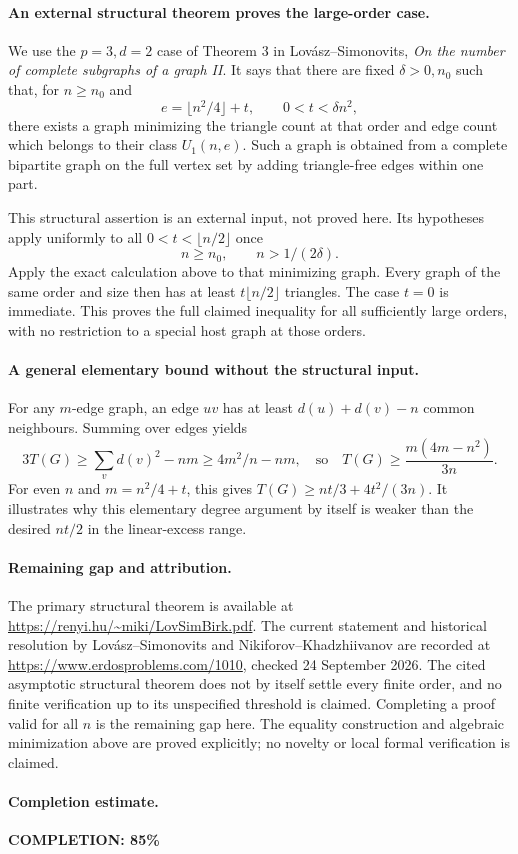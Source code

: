 \paragraph{An external structural theorem proves the large-order case.}
We use the \(p=3,d=2\) case of Theorem 3 in Lov\'asz--Simonovits, \emph{On the number of complete subgraphs of a graph II}. It says that there are fixed \(\delta>0,n_0\) such that, for \(n\geq n_0\) and
\[
 e=\lfloor n^2/4\rfloor+t,\qquad 0<t<\delta n^2,
\]
there exists a graph minimizing the triangle count at that order and edge count which belongs to their class \(U_1(n,e)\). Such a graph is obtained from a complete bipartite graph on the full vertex set by adding triangle-free edges within one part.

This structural assertion is an external input, not proved here. Its hypotheses apply uniformly to all \(0<t<\lfloor n/2\rfloor\) once
\[
 n\geq n_0,\qquad n>1/(2\delta).
\]
Apply the exact calculation above to that minimizing graph. Every graph of the same order and size then has at least \(t\lfloor n/2\rfloor\) triangles. The case \(t=0\) is immediate. This proves the full claimed inequality for all sufficiently large orders, with no restriction to a special host graph at those orders.

\paragraph{A general elementary bound without the structural input.}
For any \(m\)-edge graph, an edge \(uv\) has at least \(d(u)+d(v)-n\) common neighbours. Summing over edges yields
\[
 3T(G)\geq\sum_vd(v)^2-nm\geq4m^2/n-nm,
 \quad\text{so}\quad
 T(G)\geq\frac{m(4m-n^2)}{3n}.
\]
For even \(n\) and \(m=n^2/4+t\), this gives
\(T(G)\geq nt/3+4t^2/(3n)\). It illustrates why this elementary degree argument by itself is weaker than the desired \(nt/2\) in the linear-excess range.

\paragraph{Remaining gap and attribution.}
The primary structural theorem is available at \url{https://renyi.hu/~miki/LovSimBirk.pdf}. The current statement and historical resolution by Lov\'asz--Simonovits and Nikiforov--Khadzhiivanov are recorded at \url{https://www.erdosproblems.com/1010}, checked 24 September 2026. The cited asymptotic structural theorem does not by itself settle every finite order, and no finite verification up to its unspecified threshold is claimed. Completing a proof valid for all \(n\) is the remaining gap here. The equality construction and algebraic minimization above are proved explicitly; no novelty or local formal verification is claimed.

\paragraph{Completion estimate.}
\textbf{COMPLETION: 85\%}

